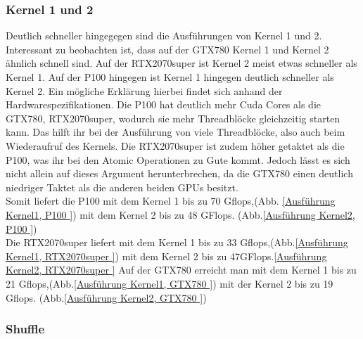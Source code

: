 \documentclass[10pt,a4paper]{article}
\begin{document}
	  \subsubsection{Kernel 1 und 2}
	 Deutlich schneller hingegegen sind die Ausführungen von Kernel 1 und 2.
	 Interessant zu beobachten ist, dass auf der GTX780 Kernel 1 und Kernel 2 ähnlich schnell sind. Auf der RTX2070super ist Kernel 2 meist etwas schneller als Kernel 1. Auf der P100 hingegen ist Kernel 1 hingegen deutlich schneller als Kernel 2. Ein mögliche Erklärung hierbei findet sich anhand der Hardwarespezifikationen. Die P100 hat deutlich mehr Cuda Cores als die GTX780, RTX2070super, wodurch sie mehr Threadblöcke gleichzeitig starten kann. Das hilft ihr bei der Ausführung von viele Threadblöcke, also auch beim Wiederaufruf des Kernels. Die RTX2070super ist zudem höher getaktet als die P100, was ihr bei den Atomic Operationen zu Gute kommt. Jedoch lässt es sich nicht allein auf dieses Argument herunterbrechen, da die GTX780 einen deutlich niedriger Taktet als die anderen beiden GPUs besitzt.\\
	 Somit liefert die P100 mit dem Kernel 1 bis zu 70 Gflops,(Abb. \ref{Ausführung Kernel1, P100 }) mit dem Kernel 2 bis zu 48 GFlops. (Abb.\ref{Ausführung Kernel2, P100 })\\
	 Die RTX2070super liefert mit dem Kernel 1 bis zu 33 Gflops,(Abb.\ref{Ausführung Kernel1, RTX2070super }) mit dem Kernel 2 bis zu 47GFlops.\ref{Ausführung Kernel2, RTX2070super }
	 Auf der GTX780 erreicht man mit dem Kernel 1 bis zu 21 Gflops,(Abb.\ref{Ausführung Kernel1, GTX780 }) mit der Kernel 2 bis zu 19  Gflops. (Abb.\ref{Ausführung Kernel2, GTX780 })
	 
	 \subsubsection{Shuffle}
\end{document}
